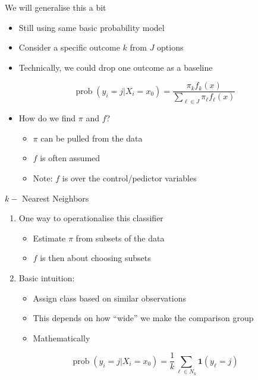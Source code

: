 \documentclass[
  ignorenonframetext,
]{beamer}
\providecommand{\tightlist}{%
  \setlength{\itemsep}{0pt}\setlength{\parskip}{0pt}}
\DeclareMathOperator{\prob}{prob}
\begin{document}
\begin{frame}{We will generalise this a bit}
\protect{}\label{we-will-generalise-this-a-bit}
\begin{itemize}
\tightlist
\item
  Still using same basic probability model
\item
  Consider a specific outcome \(k\) from \(J\) options
\item
  Technically, we could drop one outcome as a baseline
\end{itemize}

\[
\prob(y_i = j | X_i = x_0) = \frac{\pi_k f_k(x)} {\sum_{\ell \in J} \pi_\ell f_\ell(x)}
\]

\begin{itemize}
\tightlist
\item
  How do we find \(\pi\) and \(f\)?

  \begin{itemize}
  \tightlist
  \item
    \(\pi\) can be pulled from the data
  \item
    \(f\) is often assumed
  \item
    Note: \(f\) is over the control/pedictor variables
  \end{itemize}
\end{itemize}
\end{frame}

\begin{frame}{\(k-\) Nearest Neighbors}
\protect{}\label{k--nearest-neighbors}
\begin{enumerate}
\tightlist
\item
  One way to operationalise this classifier

  \begin{itemize}
  \tightlist
  \item
    Estimate \(\pi\) from subsets of the data
  \item
    \(f\) is then about choosing subsets
  \end{itemize}
\item
  Basic intuition:

  \begin{itemize}
  \tightlist
  \item
    Assign class based on similar observations
  \item
    This depends on how ``wide'' we make the comparison group
  \item
    Mathematically
  \end{itemize}
\end{enumerate}

\[
\prob(y_i = j | X_i = x_0) = \frac{1}{k} \sum_{\ell \in N_k} \mathbf{1}(y_\ell = j)
\]
\end{frame}
\end{document}
